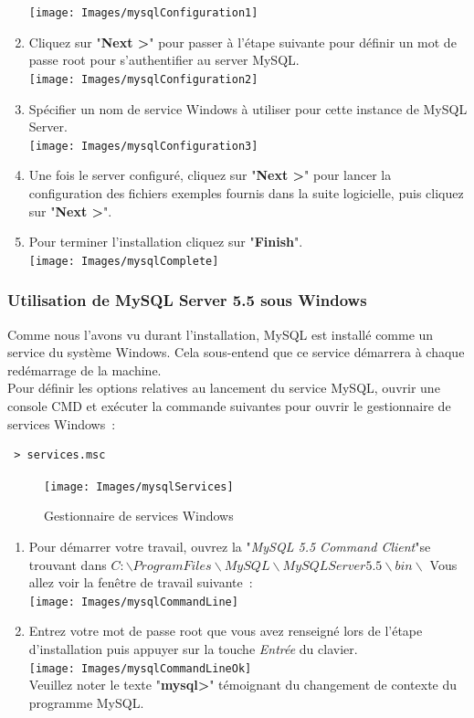 \begin{enumerate}
  \centering  
  \texttt{[image: Images/mysqlConfiguration1]}
  \item Cliquez sur "\textbf{Next >}" pour passer à l'étape suivante pour définir un mot de passe root pour s'authentifier au server MySQL.\\
 \centering 
 \texttt{[image: Images/mysqlConfiguration2]}
 \item Spécifier un nom de service Windows à utiliser pour cette instance de MySQL Server.\\
 \centering 
 \texttt{[image: Images/mysqlConfiguration3]}
 \item Une fois le server configuré, cliquez sur "\textbf{Next >}" pour lancer la configuration des fichiers exemples fournis dans la suite logicielle, puis cliquez sur "\textbf{Next >}".
 \item Pour terminer l'installation cliquez sur "\textbf{Finish}".\\
 \centering
 \texttt{[image: Images/mysqlComplete]}
 \end{enumerate}
 
 \subsubsection{Utilisation de MySQL Server 5.5 sous Windows}
 Comme nous l'avons vu durant l'installation, MySQL est installé comme un service du système Windows. Cela sous-entend que ce service démarrera à chaque redémarrage de la machine.\\
 Pour définir les options relatives au lancement du service MySQL, ouvrir une console CMD et exécuter la commande suivantes pour ouvrir le gestionnaire de services Windows~:
 \begin{lstlisting}
 > services.msc
 \end{lstlisting}
 \begin{figure}
 \centering
 \texttt{[image: Images/mysqlServices]}
 \caption{Gestionnaire de services Windows}
 \end{figure}
 
 \begin{enumerate}
 \item Pour démarrer votre travail, ouvrez la "\textit{MySQL 5.5 Command Client}"se trouvant dans $C: \backslash Program Files\backslash MySQL \backslash MySQL Server 5.5\backslash bin \backslash$
 Vous allez voir la fenêtre de travail suivante~:\\
 \centering
 \texttt{[image: Images/mysqlCommandLine]}
 \item Entrez votre mot de passe root que vous avez renseigné lors de l'étape d'installation puis appuyer sur la touche \textit{Entrée} du clavier.\\
 \centering
 \texttt{[image: Images/mysqlCommandLineOk]}\\
 Veuillez noter le texte "\textbf{mysql>}" témoignant du changement de contexte du programme MySQL.
 \end{enumerate}
 
